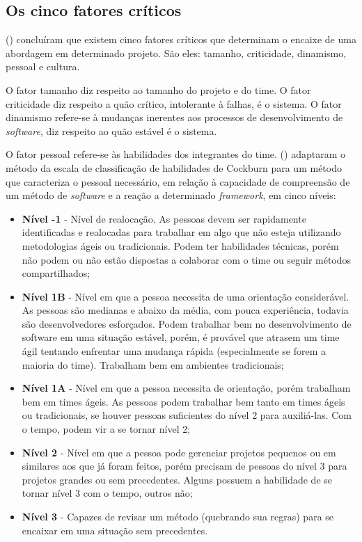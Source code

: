     
    \pagebreak
    \subsection{Os cinco fatores críticos}
     
	\citeauthor{boehm} (\citeyear{boehm}) concluíram que existem cinco fatores críticos que determinam o encaixe de uma
	abordagem em determinado projeto. São eles: tamanho, criticidade, dinamismo, pessoal e cultura.
	
	O  fator tamanho diz respeito ao tamanho do projeto e do time. O fator criticidade diz respeito a quão crítico,
	intolerante à falhas, é o sistema. O fator dinamismo refere-se à mudanças inerentes aos processos de desenvolvimento
	de \textit{software}, diz respeito ao quão estável é o sistema.
	
	O fator pessoal refere-se às habilidades dos integrantes do time. \citeauthor{boehm} (\citeyear{boehm}) adaptaram
	o método da escala de classificação de habilidades de Cockburn para um método que caracteriza o pessoal necessário,
	em relação à capacidade de compreensão de um método de \textit{software} e a reação a determinado \textit{framework},
	em cinco níveis:
	
	\begin{itemize}
	 \item \textbf{Nível -1} - Nível de realocação. As pessoas devem ser rapidamente identificadas e realocadas para
	    trabalhar em algo que não esteja utilizando metodologias ágeis ou tradicionais. Podem ter habilidades técnicas,
	    porém não podem ou não estão dispostas a colaborar com o time ou seguir métodos compartilhados;
	 
	 \item \textbf{Nível 1B} - Nível em que a pessoa necessita de uma orientação considerável. As pessoas são medianas
	    e abaixo da média, com pouca experiência, todavia são desenvolvedores esforçados. Podem trabalhar bem no
	    desenvolvimento de software em uma situação estável, porém, é provável que atrasem um time ágil tentando
	    enfrentar uma mudança rápida (especialmente se forem a maioria do time). Trabalham bem em ambientes tradicionais;
	 
	 \item \textbf{Nível 1A} - Nível em que a pessoa necessita de orientação, porém trabalham bem em times ágeis.
	    As pessoas podem trabalhar bem tanto em times ágeis ou tradicionais, se houver pessoas suficientes do nível 2
	    para auxiliá-las. Com o tempo, podem vir a se tornar nível 2;
	 
	 \item \textbf{Nível 2} - Nível em que a pessoa pode gerenciar projetos pequenos ou em similares aos que já foram
	    feitos, porém precisam de pessoas do nível 3 para projetos grandes ou sem precedentes. Alguns possuem a habilidade
	    de se tornar nível 3 com o tempo, outros não;
	 
	 \item \textbf{Nível 3} - Capazes de revisar um método (quebrando sua regras) para se encaixar em uma situação
	    sem precedentes.
	\end{itemize}
	
